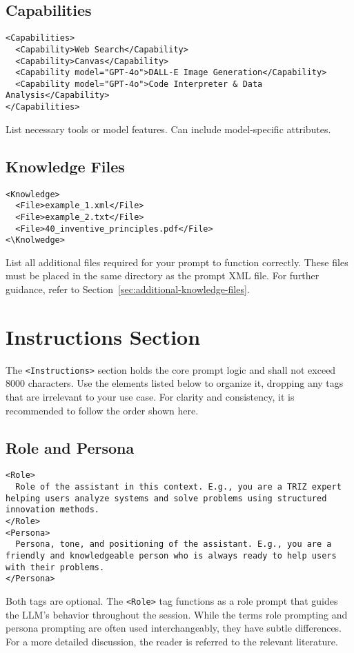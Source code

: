 \documentclass[a4paper,11pt]{refart}
\begin{document}
\subsection{Capabilities}
\begin{lstlisting}
<Capabilities>
  <Capability>Web Search</Capability>
  <Capability>Canvas</Capability>
  <Capability model="GPT-4o">DALL-E Image Generation</Capability>
  <Capability model="GPT-4o">Code Interpreter & Data Analysis</Capability>
</Capabilities>
\end{lstlisting}
List necessary tools or model features. Can include model-specific attributes.

\subsection{Knowledge Files}
\begin{lstlisting}
<Knowledge>
  <File>example_1.xml</File>
  <File>example_2.txt</File>
  <File>40_inventive_principles.pdf</File>
<\Knolwedge>
\end{lstlisting}
List all additional files required for your prompt to function correctly. These files must be placed in the same directory as the prompt XML file. For further guidance, refer to Section~\ref{sec:additional-knowledge-files}.

\section{Instructions Section}
The \lstinline!<Instructions>! section holds the core prompt logic and shall not exceed 8000 characters. Use the elements listed below to organize it, dropping any tags that are irrelevant to your use case. For clarity and consistency, it is recommended to follow the order shown here.

\subsection{Role and Persona}
\begin{lstlisting}
<Role>
  Role of the assistant in this context. E.g., you are a TRIZ expert helping users analyze systems and solve problems using structured innovation methods.
</Role>
<Persona>
  Persona, tone, and positioning of the assistant. E.g., you are a friendly and knowledgeable person who is always ready to help users with their problems.
</Persona>
\end{lstlisting}
Both tags are optional. The \lstinline!<Role>! tag functions as a role prompt that guides the LLM's behavior throughout the session. While the terms role prompting and persona prompting are often used interchangeably, they have subtle differences. For a more detailed discussion, the reader is referred to the relevant literature. \cite{zotero-item-1637,debnath2025,park2023,wei2023}
\end{document}
